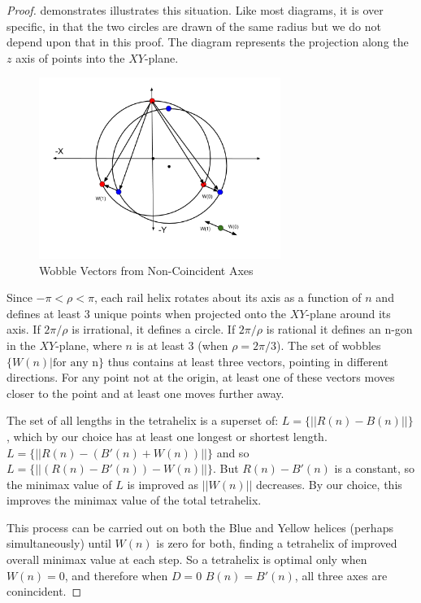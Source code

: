 \documentclass[review]{siamonline1116}
\begin{document}
\begin{proof}
   demonstrates illustrates this situation. Like most diagrams, it is
  over specific, in that the two circles are drawn of the same radius but we do not
  depend upon that in this proof.  The diagram represents the projection along the
  $z$ axis of points into the $XY$-plane.

  \begin{figure}[H]
     \centering
     \includegraphics[width=0.7\textwidth]{figures/WobbleDiagram.png}
     \caption{Wobble Vectors from Non-Coincident Axes}
  \label{fig:wobble}
\end{figure}
  
  Since $-\pi<\rho<\pi$, each rail helix rotates about its axis as a function of $n$ and
  defines at least 3 unique points when projected onto the $XY$-plane around its axis.
  If $2\pi/\rho$ is irrational, it defines a circle. If $2\pi/\rho$ is rational it defines
  an n-gon in the $XY$-plane, where $n$ is at least 3 (when $\rho = 2\pi/3$).
  The set of wobbles $\{W(n) | \text{for any n}\}$ thus contains at least three vectors,
  pointing in different directions.
  For any point not at the origin, at least one of these vectors moves closer to the
  point and at least one moves further away.

    The set of all lengths in the tetrahelix is a superset of:
    $L = \{|| R(n) - B(n)||\}$, which by our choice has at least one longest or shortest
    length.
    $L = \{|| R(n) - (B'(n) + W(n))||\}$ and so
    $L = \{|| (R(n) - B'(n)) - W(n)||\}$.
    But $R(n) - B'(n)$ is a constant, so the minimax value of $L$ is improved as $||W(n)||$
    decreases.  
    By our choice, this improves the minimax value of the total tetrahelix.
    
    This process can be carried out on both the Blue and Yellow helices
    (perhaps simultaneously) until $W(n)$ is
    zero for both, finding a tetrahelix of improved overall minimax value at each step.
    So a tetrahelix is optimal only when $W(n) = 0$, and therefore when $D=0$
    $B(n) = B'(n)$, all three axes are conincident.
\end{proof}
\end{document}
